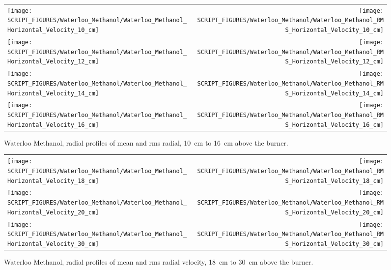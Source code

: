 \begin{figure}[p]
\begin{tabular*}{\textwidth}{l@{\extracolsep{\fill}}r}
\texttt{[image: SCRIPT\_FIGURES/Waterloo\_Methanol/Waterloo\_Methanol\_Horizontal\_Velocity\_10\_cm]} &
\texttt{[image: SCRIPT\_FIGURES/Waterloo\_Methanol/Waterloo\_Methanol\_RMS\_Horizontal\_Velocity\_10\_cm]} \\
\texttt{[image: SCRIPT\_FIGURES/Waterloo\_Methanol/Waterloo\_Methanol\_Horizontal\_Velocity\_12\_cm]} &
\texttt{[image: SCRIPT\_FIGURES/Waterloo\_Methanol/Waterloo\_Methanol\_RMS\_Horizontal\_Velocity\_12\_cm]} \\
\texttt{[image: SCRIPT\_FIGURES/Waterloo\_Methanol/Waterloo\_Methanol\_Horizontal\_Velocity\_14\_cm]} &
\texttt{[image: SCRIPT\_FIGURES/Waterloo\_Methanol/Waterloo\_Methanol\_RMS\_Horizontal\_Velocity\_14\_cm]} \\
\texttt{[image: SCRIPT\_FIGURES/Waterloo\_Methanol/Waterloo\_Methanol\_Horizontal\_Velocity\_16\_cm]} &
\texttt{[image: SCRIPT\_FIGURES/Waterloo\_Methanol/Waterloo\_Methanol\_RMS\_Horizontal\_Velocity\_16\_cm]}
\end{tabular*}
\caption[Waterloo Methanol, radial mean and rms radial velocity, 10~cm to 16~cm above burner]
{Waterloo Methanol, radial profiles of mean and rms radial, 10~cm to 16~cm above the burner.}
\label{Water_Methanol_Hori_Vel_2}
\end{figure}

\begin{figure}[p]
\begin{tabular*}{\textwidth}{l@{\extracolsep{\fill}}r}
\texttt{[image: SCRIPT\_FIGURES/Waterloo\_Methanol/Waterloo\_Methanol\_Horizontal\_Velocity\_18\_cm]} &
\texttt{[image: SCRIPT\_FIGURES/Waterloo\_Methanol/Waterloo\_Methanol\_RMS\_Horizontal\_Velocity\_18\_cm]} \\
\texttt{[image: SCRIPT\_FIGURES/Waterloo\_Methanol/Waterloo\_Methanol\_Horizontal\_Velocity\_20\_cm]} &
\texttt{[image: SCRIPT\_FIGURES/Waterloo\_Methanol/Waterloo\_Methanol\_RMS\_Horizontal\_Velocity\_20\_cm]} \\
\texttt{[image: SCRIPT\_FIGURES/Waterloo\_Methanol/Waterloo\_Methanol\_Horizontal\_Velocity\_30\_cm]} &
\texttt{[image: SCRIPT\_FIGURES/Waterloo\_Methanol/Waterloo\_Methanol\_RMS\_Horizontal\_Velocity\_30\_cm]}
\end{tabular*}
\caption[Waterloo Methanol, radial mean and rms radial velocity, 18~cm to 30~cm above burner]
{Waterloo Methanol, radial profiles of mean and rms radial velocity, 18~cm to 30~cm above the burner.}
\label{Water_Methanol_Hori_Vel_3}
\end{figure}


